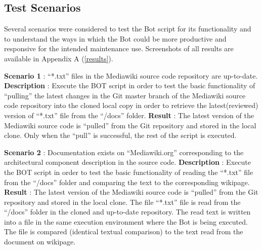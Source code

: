 \subsection{Test Scenarios}
Several scenarios were considered to test the Bot script for its functionality and to understand the ways in which the Bot could be more productive and responsive for the intended maintenance use. Screenshots of all results are available in Appendix A (\autoref{results}).
\begin{mdframed}[leftmargin=10pt,rightmargin=10pt]
\textbf{Scenario 1} : \enquote{*.txt} files in the Mediawiki source code repository are up-to-date.
\newline
\newline \textbf{Description} : Execute the BOT script in order to test the basic functionality of \enquote{pulling} the latest changes in the Git master branch of the Mediawiki source code repository into the cloned local copy in order to retrieve the latest(reviewed) version of \enquote{*.txt} file from the \enquote{/docs} folder.
\newline 
\newline \textbf{Result} : The latest version of the Mediawiki source code is \enquote{pulled} from the Git repository and stored in the local clone. Only when the \enquote{pull} is successful, the rest of the script is executed.
\end{mdframed}

\begin{mdframed}[leftmargin=10pt,rightmargin=10pt]
\textbf{Scenario 2} : Documentation exists on \enquote{Mediawiki.org} corresponding to the architectural component description in the source code.
\newline
\newline \textbf{Description} : Execute the BOT script in order to test the basic functionality of reading the \enquote{*.txt} file from the \enquote{/docs} folder and comparing the text to the corresponding wikipage.
\newline 
\newline \textbf{Result} : The latest version of the Mediawiki source code is \enquote{pulled} from the Git repository and stored in the local clone. The file \enquote{*.txt} file is read from the \enquote{/docs} folder in the cloned and up-to-date repository. The read text is written into a file in the same execution environment where the Bot is being executed. The file is compared (identical textual comparison) to the text read from the document on wikipage.
\end{mdframed}

